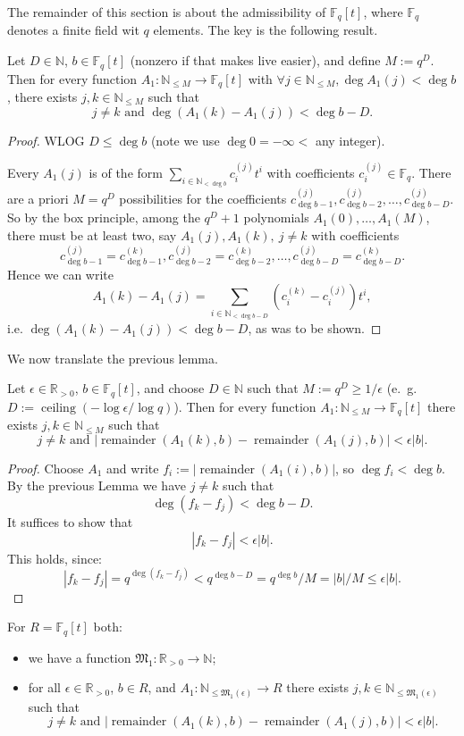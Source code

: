 \documentclass{amsart}
\newcommand{\N}{\mathbb{N}}
\newcommand{\R}{\mathbb{R}}
\newcommand{\F}{\mathbb{F}}
\newcommand{\M}{\mathfrak{M}}
\newcommand{\remainder}{\operatorname{remainder}}
\begin{document}
The remainder of this section is about the admissibility of $\F_q[t]$, where $\F_q$ denotes a finite field wit $q$ elements.
The key is the following result.

\begin{lemma}
Let $D \in \N$, $b \in \F_q[t]$ (nonzero if that makes live easier), and define $M:=q^D$. Then for every function
$A_1: \N_{\leq M} \to \F_q[t]$ with $\forall j \in  \N_{\leq M}, \deg A_1(j) < \deg b$, there exists $j,k \in \N_{\leq M}$ such that
\[j \neq k \text{ and } \deg(A_1(k)-A_1(j)) < \deg b-D.\]
\end{lemma}

\begin{proof}
WLOG $D \leq \deg b$ (note we use $\deg 0 = -\infty < $ any integer).

Every $A_1(j)$ is of the form $\sum_{i \in \N_{< \deg b}} c_i^{(j)} t^i$ with coefficients $c_i^{(j)} \in \F_q$.
There are a priori $M=q^D$ possibilities for the coefficients $c_{\deg b-1}^{(j)}, c_{\deg b-2}^{(j)},\ldots, c_{\deg b-D}^{(j)}$.
So by the box principle, among the $q^D+1$ polynomials $A_1(0), \ldots, A_1(M)$, there must be at least two, say $A_1(j), A_1(k),\ j\not=k$ with coefficients 
\[c_{\deg b-1}^{(j)}=c_{\deg b-1}^{(k)}, c_{\deg b-2}^{(j)}= c_{\deg b-2}^{(k)},\ldots, c_{\deg b-D}^{(j)}= c_{\deg b-D}^{(k)}.\] Hence we can write
 \[A_1(k)-A_1(j)=\sum_{i \in \N_{<\deg b-D}} (c_i^{(k)}-c_i^{(j)}) t^i,\]
i.e. $\deg (A_1(k)-A_1(j))<\deg b-D$, as was to be shown.
\end{proof}

We now translate the previous lemma.
\begin{lemma}
Let $\epsilon \in \R_{>0}$, $b \in \F_q[t]$, and choose $D \in \N$ such that $M:=q^D\geq 1/\epsilon$ (e.~g.~ $D:=\operatorname{ceiling} (-\log \epsilon/\log q)$).
Then for every function
$A_1: \N_{\leq M} \to \F_q[t]$ there exists $j,k \in \N_{\leq M}$ such that
\[j \neq k \text{ and } |\remainder(A_1(k),b)-\remainder(A_1(j),b)| < \epsilon |b|.\]
\end{lemma}

\begin{proof}
Choose $A_1$ and write $f_i:= |\remainder(A_1(i),b)|$, so $\deg f_i < \deg b$. By the previous Lemma we have $j\not=k$ such that
\[\deg (f_k-f_j) <\deg b -D.\]
It suffices to show that
\[|f_k-f_j| <\epsilon |b|.\]
This holds, since:
\[ |f_k-f_j|=q^{\deg(f_k-f_j)}<q^{\deg b -D}=q^{\deg b}/M=|b|/M\leq \epsilon |b|.\]
\end{proof}


\begin{lemma}\label{lem admissible 1D}
For $R=\F_q[t]$ both:
\begin{itemize}
\item we have a function $\M_1 : \R_{>0} \to \N$;
\item for all $ \epsilon \in \R_{>0}$, $b \in R$, and $A_1: \N_{\leq \M_1(\epsilon)} \to R$ there exists $j,k \in \N_{\leq \M_1(\epsilon)}$ such that
\[j \neq k \text{ and } |\remainder(A_1(k),b)-\remainder(A_1(j),b)| < \epsilon |b|.\]
\end{itemize}
\end{lemma}
\end{document}
